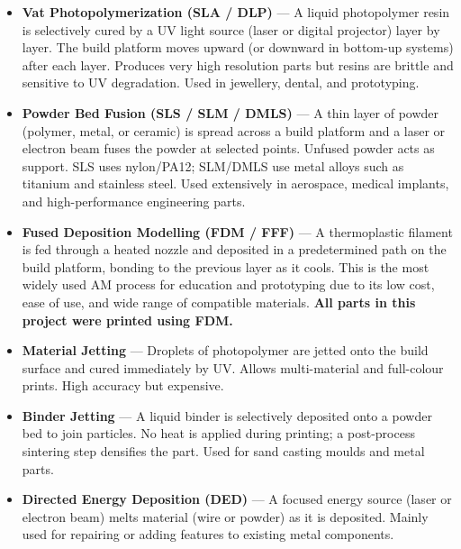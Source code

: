 \documentclass[12pt, a4paper]{article}
\begin{document}
\begin{itemize}[itemsep=4pt]

  \item \textbf{Vat Photopolymerization (SLA / DLP)} --- A liquid photopolymer
  resin is selectively cured by a UV light source (laser or digital projector)
  layer by layer. The build platform moves upward (or downward in bottom-up
  systems) after each layer. Produces very high resolution parts but resins are
  brittle and sensitive to UV degradation. Used in jewellery, dental, and
  prototyping.

  \item \textbf{Powder Bed Fusion (SLS / SLM / DMLS)} --- A thin layer of
  powder (polymer, metal, or ceramic) is spread across a build platform and a
  laser or electron beam fuses the powder at selected points. Unfused powder
  acts as support. SLS uses nylon/PA12; SLM/DMLS use metal alloys such as
  titanium and stainless steel. Used extensively in aerospace, medical implants,
  and high-performance engineering parts.

  \item \textbf{Fused Deposition Modelling (FDM / FFF)} --- A thermoplastic
  filament is fed through a heated nozzle and deposited in a predetermined path
  on the build platform, bonding to the previous layer as it cools. This is the
  most widely used AM process for education and prototyping due to its low cost,
  ease of use, and wide range of compatible materials. \textbf{All parts in this
  project were printed using FDM.}

  \item \textbf{Material Jetting} --- Droplets of photopolymer are jetted onto
  the build surface and cured immediately by UV. Allows multi-material and
  full-colour prints. High accuracy but expensive.

  \item \textbf{Binder Jetting} --- A liquid binder is selectively deposited
  onto a powder bed to join particles. No heat is applied during printing;
  a post-process sintering step densifies the part. Used for sand casting moulds
  and metal parts.

  \item \textbf{Directed Energy Deposition (DED)} --- A focused energy source
  (laser or electron beam) melts material (wire or powder) as it is deposited.
  Mainly used for repairing or adding features to existing metal components.

\end{itemize}
\end{document}
